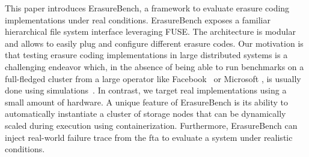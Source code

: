 



This paper introduces ErasureBench, a framework to evaluate erasure coding implementations under real conditions. 
ErasureBench exposes a familiar hierarchical file system interface leveraging FUSE.
The architecture is modular and allows to easily plug and configure different erasure codes.
Our motivation is that testing erasure coding implementations in large distributed systems is a challenging endeavor which, in the absence of being able to run benchmarks on a full-fledged cluster from a large operator like Facebook~\autocite{XorbasVLDB} or Microsoft \cite{DBLP:conf/usenix/HuangSXOCG0Y12}, is usually done using simulations~\autocite{Silberstein2014}. 
In contrast, we target real implementations using a small amount of hardware. 
A unique feature of ErasureBench is its ability to automatically instantiate a cluster of storage nodes that can be dynamically scaled during execution using containerization. %
Furthermore, ErasureBench can inject real-world failure trace from the \ac{fta} \autocite{fta-journal} to evaluate a system under realistic conditions. 

